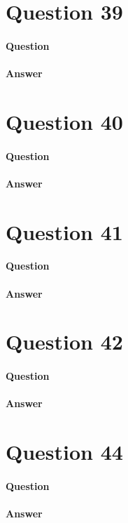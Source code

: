 \documentclass{article}
\begin{document}
    \section{Question 39}
    \paragraph{Question}
    \paragraph{Answer}
    \begin{center}
    \end{center}

    \section{Question 40}
    \paragraph{Question}
    \paragraph{Answer}
    \begin{center}
    \end{center}

    \section{Question 41}
    \paragraph{Question}
    \paragraph{Answer}
    \begin{center}
    \end{center}

    \section{Question 42}
    \paragraph{Question}
    \paragraph{Answer}
    \begin{center}
    \end{center}

    \section{Question 44}
    \paragraph{Question}
    \paragraph{Answer}
    \begin{center}
    \end{center}
    
\end{document}
